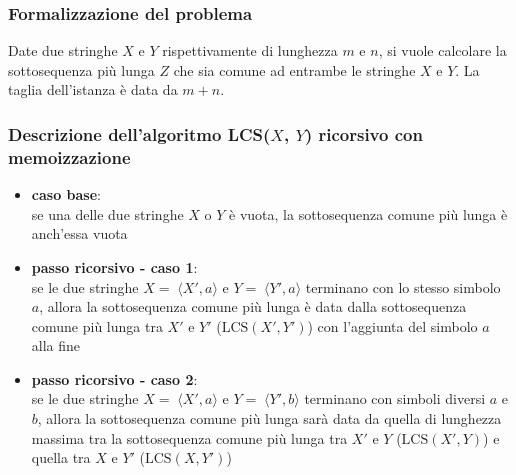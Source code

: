 \subsubsection*{Formalizzazione del problema}
Date due stringhe \(X\) e \(Y\) rispettivamente di lunghezza \(m\) e \(n\), si vuole calcolare la sottosequenza più lunga
\(Z\) che sia comune ad entrambe le stringhe \(X\) e \(Y\). La taglia dell'istanza è data da \(m + n\).

\subsubsection*{Descrizione dell'algoritmo LCS(\(X\), \(Y\)) ricorsivo con memoizzazione}
\begin{itemize}
	\item \textbf{caso base}: \\
	se una delle due stringhe \(X\) o \(Y\) è vuota, la sottosequenza comune più lunga è anch'essa vuota
	\item \textbf{passo ricorsivo - caso 1}: \\
	se le due stringhe \(X = \; \langle X', a \rangle\) e \(Y = \; \langle Y', a \rangle\) terminano con lo stesso simbolo \(a\), allora la sottosequenza
	comune più lunga è data dalla sottosequenza comune più lunga tra \(X'\) e \(Y'\) (\(\text{LCS}(X', Y')\)) con l'aggiunta del
	simbolo \(a\) alla fine
	\item \textbf{passo ricorsivo - caso 2}: \\
	se le due stringhe \(X = \; \langle X', a \rangle\) e \(Y = \; \langle Y', b \rangle\) terminano con simboli diversi \(a\) e \(b\), allora la sottosequenza
	comune più lunga sarà data da quella di lunghezza massima tra la sottosequenza comune più lunga tra \(X'\) e \(Y\) (\(\text{LCS}(X', Y)\)) e
	quella tra \(X\) e \(Y'\) (\(\text{LCS}(X, Y')\))
\end{itemize}
\vspace{5pt}

